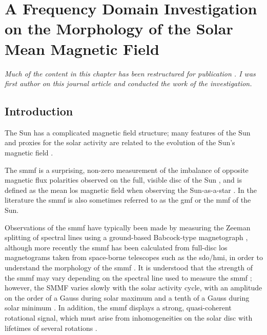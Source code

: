 \chapter{A Frequency Domain Investigation on the Morphology of the Solar Mean Magnetic Field}\label{chap:SMMF}


\textit{Much of the content in this chapter has been restructured for publication \citep{ross_lifetimes_2021}. I was first author on this journal article and conducted the work of the investigation.}

\section{Introduction}\label{sec:SMMF_intro}

The Sun has a complicated magnetic field structure; many features of the Sun and proxies for the solar activity are related to the evolution of the Sun's magnetic field \citep{wu_solar_2018}.

The \gls{smmf} is a surprising, non-zero measurement of the imbalance of opposite magnetic flux polarities observed on the full, visible disc of the Sun \citep{svalgaard_suns_1975}, and is defined as the mean \gls{los} magnetic field when observing the Sun-as-a-star \citep{scherrer_mean_1977, scherrer_mean_1977-1, garcia_integrated_1999}. In the literature the \gls{smmf} is also sometimes referred to as the \gls{gmf} \citep{severny_time_1971} or the \gls{mmf} \citep{kotov_mean_2008} of the Sun.

Observations of the \gls{smmf} have typically been made by measuring the Zeeman splitting of spectral lines using a ground-based Babcock-type magnetograph \citep{scherrer_mean_1977}, although more recently the \gls{smmf} has been calculated from full-disc \gls{los} magnetograms taken from space-borne telescopes such as the \gls{sdo/hmi}, in order to understand the morphology of the \gls{smmf} \citep{kutsenko_contribution_2017, bose_variability_2018}. It is understood that the strength of the \gls{smmf} may vary depending on the spectral line used to measure the \gls{smmf} \citep{kotov_mean_2008, kotov_enigmas_2012}; however, the SMMF varies slowly with the solar activity cycle, with an amplitude on the order of a Gauss during solar maximum and a tenth of a Gauss during solar minimum \citep{plachinda_general_2011}. In addition, the \gls{smmf} displays a strong, quasi-coherent rotational signal, which must arise from inhomogeneities on the solar disc with lifetimes of several rotations \citep{chaplin_studies_2003, xie_temporal_2017}.

